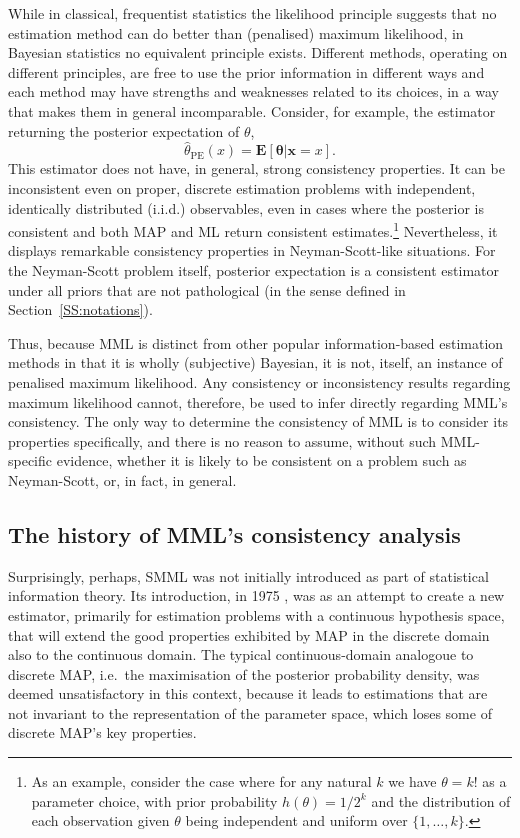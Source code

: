 \documentclass{IEEEtran}
\newcommand{\citep}[1]{\cite{#1}}
\begin{document}
While in classical, frequentist statistics the likelihood principle
suggests that no estimation method can do better than
(penalised) maximum likelihood, in Bayesian statistics no equivalent principle
exists. Different methods, operating on different principles, are free to
use the prior information in different ways and each method may have strengths
and weaknesses related to its choices, in a way that makes them in general
incomparable. Consider, for example, the estimator returning the posterior
expectation of $\theta$,
\[
\hat{\theta}_{\text{PE}}(x)=\mathbf{E}[\boldsymbol{\theta}|\boldsymbol{x}=x].
\]
This estimator does not have, in general, strong consistency properties. It
can be inconsistent even on proper, discrete estimation problems with
independent, identically distributed (i.i.d.) observables, even in cases where
the posterior is consistent and
both MAP and ML return consistent estimates.\footnote{As an example, consider
the case where for any natural $k$ we have $\theta=k!$ as a parameter choice,
with prior probability $h(\theta)=1/2^k$ and the distribution of each
observation given $\theta$ being independent and uniform over $\{1,\ldots,k\}$.}
Nevertheless, it displays remarkable consistency
properties in Neyman-Scott-like situations. For the Neyman-Scott problem itself,
posterior expectation is a consistent estimator under all priors that are
not pathological (in the sense defined in Section~\ref{SS:notations}).

Thus, because MML is distinct from other popular information-based estimation
methods in that it is wholly (subjective) Bayesian, it is not, itself, an
instance of penalised maximum likelihood. Any consistency or inconsistency
results regarding maximum likelihood cannot, therefore, be used to infer
directly regarding MML's consistency. The only way to determine the
consistency of MML is to consider its properties specifically, and there is
no reason to assume, without such MML-specific evidence, whether it 
is likely to be consistent on a problem such as Neyman-Scott, or, in fact,
in general.

\subsection{The history of MML's consistency analysis}

Surprisingly, perhaps, SMML was not initially introduced as part of
statistical information theory. Its introduction, in 1975
\citep{wallace1975invariant}, was as an attempt to
create a new estimator, primarily for estimation problems with a
continuous hypothesis space, that
will extend the good properties exhibited by MAP in the discrete domain also
to the continuous domain. The typical continuous-domain analogoue to discrete
MAP, i.e.\ the maximisation of the posterior probability density,
was deemed unsatisfactory in this context, because it leads to
estimations that are not invariant to the representation of the parameter
space, which loses some of discrete MAP's key properties.
\end{document}
